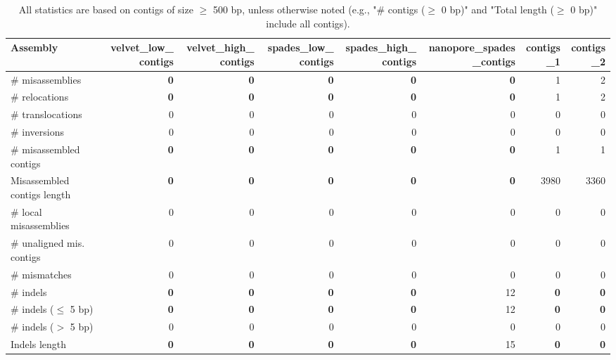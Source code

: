 \documentclass[12pt,a4paper]{article}
\begin{document}
\begin{table}[ht]
\begin{center}
\caption{All statistics are based on contigs of size $\geq$ 500 bp, unless otherwise noted (e.g., "\# contigs ($\geq$ 0 bp)" and "Total length ($\geq$ 0 bp)" include all contigs).}
\begin{tabular}{|l*{7}{|r}|}
\hline
Assembly & velvet\_low\_contigs & velvet\_high\_contigs & spades\_low\_contigs & spades\_high\_contigs & nanopore\_spades\_contigs & contigs\_1 & contigs\_2 \\ \hline
\# misassemblies & {\bf 0} & {\bf 0} & {\bf 0} & {\bf 0} & {\bf 0} & 1 & 2 \\ \hline
\hspace{5mm}\# relocations & {\bf 0} & {\bf 0} & {\bf 0} & {\bf 0} & {\bf 0} & 1 & 2 \\ \hline
\hspace{5mm}\# translocations & 0 & 0 & 0 & 0 & 0 & 0 & 0 \\ \hline
\hspace{5mm}\# inversions & 0 & 0 & 0 & 0 & 0 & 0 & 0 \\ \hline
\# misassembled contigs & {\bf 0} & {\bf 0} & {\bf 0} & {\bf 0} & {\bf 0} & 1 & 1 \\ \hline
Misassembled contigs length & {\bf 0} & {\bf 0} & {\bf 0} & {\bf 0} & {\bf 0} & 3980 & 3360 \\ \hline
\# local misassemblies & 0 & 0 & 0 & 0 & 0 & 0 & 0 \\ \hline
\# unaligned mis. contigs & 0 & 0 & 0 & 0 & 0 & 0 & 0 \\ \hline
\# mismatches & 0 & 0 & 0 & 0 & 0 & 0 & 0 \\ \hline
\# indels & {\bf 0} & {\bf 0} & {\bf 0} & {\bf 0} & 12 & {\bf 0} & {\bf 0} \\ \hline
\hspace{5mm}\# indels ($\leq$ 5 bp) & {\bf 0} & {\bf 0} & {\bf 0} & {\bf 0} & 12 & {\bf 0} & {\bf 0} \\ \hline
\hspace{5mm}\# indels ($>$ 5 bp) & 0 & 0 & 0 & 0 & 0 & 0 & 0 \\ \hline
Indels length & {\bf 0} & {\bf 0} & {\bf 0} & {\bf 0} & 15 & {\bf 0} & {\bf 0} \\ \hline
\end{tabular}
\end{center}
\end{table}
\end{document}

